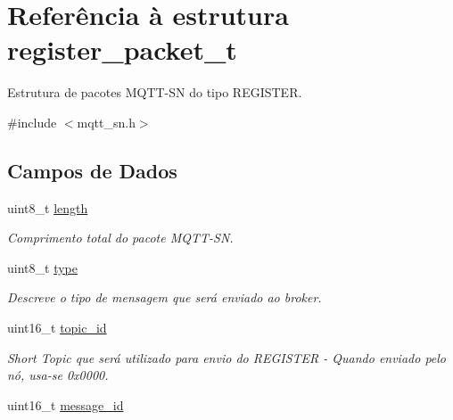 \hypertarget{structregister__packet__t}{\section{Referência à estrutura register\+\_\+packet\+\_\+t}
\label{structregister__packet__t}
}


Estrutura de pacotes M\+Q\+T\+T-\/\+S\+N do tipo R\+E\+G\+I\+S\+T\+E\+R.  




{\ttfamily \#include $<$mqtt\+\_\+sn.\+h$>$}

\subsection*{Campos de Dados}
\begin{DoxyCompactItemize}
\item 
\hypertarget{structregister__packet__t_af9d495c1655d813d553030485d00fea7}{uint8\+\_\+t \hyperlink{structregister__packet__t_af9d495c1655d813d553030485d00fea7}{length}}\label{structregister__packet__t_af9d495c1655d813d553030485d00fea7}

\begin{DoxyCompactList}\small\item\em Comprimento total do pacote M\+Q\+T\+T-\/\+S\+N. \end{DoxyCompactList}\item 
\hypertarget{structregister__packet__t_a7aead736a07eaf25623ad7bfa1f0ee2d}{uint8\+\_\+t \hyperlink{structregister__packet__t_a7aead736a07eaf25623ad7bfa1f0ee2d}{type}}\label{structregister__packet__t_a7aead736a07eaf25623ad7bfa1f0ee2d}

\begin{DoxyCompactList}\small\item\em Descreve o tipo de mensagem que será enviado ao broker. \end{DoxyCompactList}\item 
\hypertarget{structregister__packet__t_ab0380a82be366f48263095460986c3c7}{uint16\+\_\+t \hyperlink{structregister__packet__t_ab0380a82be366f48263095460986c3c7}{topic\+\_\+id}}\label{structregister__packet__t_ab0380a82be366f48263095460986c3c7}

\begin{DoxyCompactList}\small\item\em Short Topic que será utilizado para envio do R\+E\+G\+I\+S\+T\+E\+R -\/ Quando enviado pelo nó, usa-\/se 0x0000. \end{DoxyCompactList}\item 
\hypertarget{structregister__packet__t_a5f2be45182f0cc39afb7cc3a8d55a1f1}{uint16\+\_\+t \hyperlink{structregister__packet__t_a5f2be45182f0cc39afb7cc3a8d55a1f1}{message\+\_\+id}}\label{structregister__packet__t_a5f2be45182f0cc39afb7cc3a8d55a1f1}


\end{DoxyCompactItemize}
